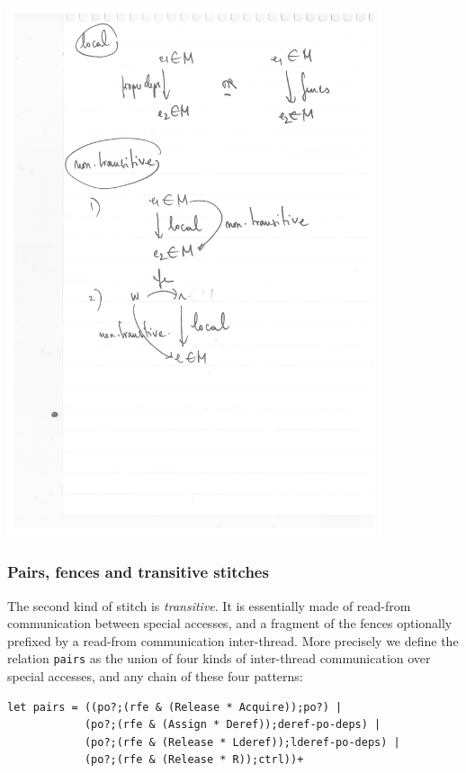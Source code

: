 \documentclass[a4paper]{article}
\begin{document}
\includegraphics[width=11cm]{local}

\pagebreak

\subsubsection{Pairs, fences and transitive stitches}

The second kind of stitch is \emph{transitive}. It is essentially made of
read-from communication between special accesses, and a fragment of the fences
optionally prefixed by a read-from communication inter-thread. More precisely
we define the relation {\tt pairs} as the union of four kinds of inter-thread
communication over special accesses, and any chain of these four patterns:
\begin{verbatim}
let pairs = ((po?;(rfe & (Release * Acquire));po?) |
            (po?;(rfe & (Assign * Deref));deref-po-deps) |
            (po?;(rfe & (Release * Lderef));lderef-po-deps) |
            (po?;(rfe & (Release * R));ctrl))+
\end{verbatim}
\end{document}
